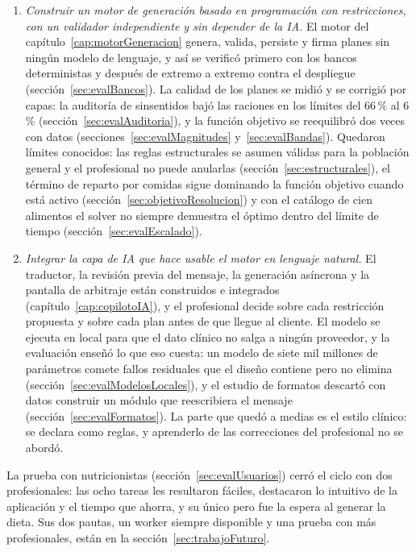 \begin{enumerate}
    \item \textit{Construir un motor de generación basado en programación con restricciones, con un validador independiente y sin depender de la IA.} El motor del capítulo~\ref{cap:motorGeneracion} genera, valida, persiste y firma planes sin ningún modelo de lenguaje, y así se verificó primero con los bancos deterministas y después de extremo a extremo contra el despliegue (sección~\ref{sec:evalBancos}). La calidad de los planes se midió y se corrigió por capas: la auditoría de sinsentidos bajó las raciones en los límites del 66\,\% al 6\,\% (sección~\ref{sec:evalAuditoria}), y la función objetivo se reequilibró dos veces con datos (secciones~\ref{sec:evalMagnitudes} y~\ref{sec:evalBandas}). Quedaron límites conocidos: las reglas estructurales se asumen válidas para la población general y el profesional no puede anularlas (sección~\ref{sec:estructurales}), el término de reparto por comidas sigue dominando la función objetivo cuando está activo (sección~\ref{sec:objetivoResolucion}) y con el catálogo de cien alimentos el solver no siempre demuestra el óptimo dentro del límite de tiempo (sección~\ref{sec:evalEscalado}).

    \item \textit{Integrar la capa de IA que hace usable el motor en lenguaje natural.} El traductor, la revisión previa del mensaje, la generación asíncrona y la pantalla de arbitraje están construidos e integrados (capítulo~\ref{cap:copilotoIA}), y el profesional decide sobre cada restricción propuesta y sobre cada plan antes de que llegue al cliente. El modelo se ejecuta en local para que el dato clínico no salga a ningún proveedor, y la evaluación enseñó lo que eso cuesta: un modelo de siete mil millones de parámetros comete fallos residuales que el diseño contiene pero no elimina (sección~\ref{sec:evalModelosLocales}), y el estudio de formatos descartó con datos construir un módulo que reescribiera el mensaje (sección~\ref{sec:evalFormatos}). La parte que quedó a medias es el estilo clínico: se declara como reglas, y aprenderlo de las correcciones del profesional no se abordó.
\end{enumerate}

La prueba con nutricionistas (sección~\ref{sec:evalUsuarios}) cerró el ciclo con dos profesionales: las ocho tareas les resultaron fáciles, destacaron lo intuitivo de la aplicación y el tiempo que ahorra, y su único pero fue la espera al generar la dieta. Sus dos pautas, un worker siempre disponible y una prueba con más profesionales, están en la sección~\ref{sec:trabajoFuturo}.

